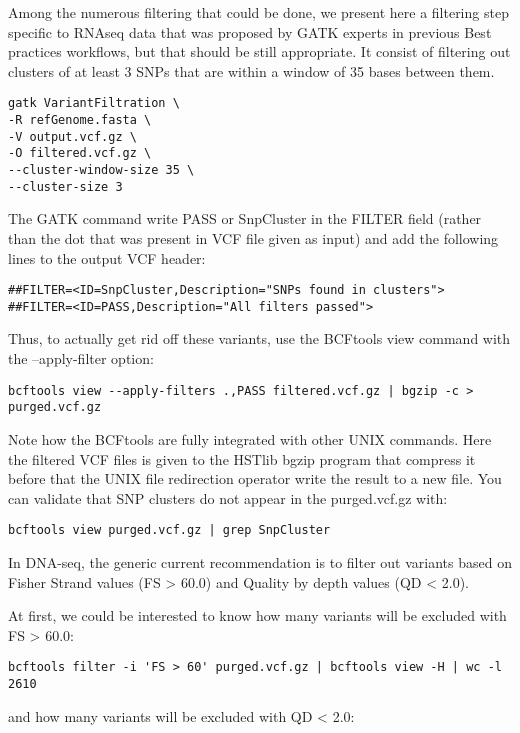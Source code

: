 Among the numerous filtering that could be done, we present here a filtering step specific to RNAseq data that was proposed by GATK experts in previous Best practices workflows, but that should be still appropriate. It consist of filtering out clusters of at least 3 SNPs that are within a window of 35 bases between them.


\begin{verbatim}
gatk VariantFiltration \
-R refGenome.fasta \
-V output.vcf.gz \
-O filtered.vcf.gz \
--cluster-window-size 35 \
--cluster-size 3
\end{verbatim}

The GATK command write PASS or SnpCluster in the FILTER field (rather than the dot that was present in VCF file given as input) and add the following lines to the output VCF header:

\begin{verbatim}
##FILTER=<ID=SnpCluster,Description="SNPs found in clusters">
##FILTER=<ID=PASS,Description="All filters passed">
\end{verbatim}


Thus, to actually get rid off these variants, use the BCFtools view command with the --apply-filter option:
\begin{verbatim}
bcftools view --apply-filters .,PASS filtered.vcf.gz | bgzip -c > purged.vcf.gz
\end{verbatim}


Note how the BCFtools are fully integrated with other UNIX commands. Here the filtered VCF files is given to the HSTlib bgzip program that compress it before that the UNIX file redirection operator write the result to a new file. You can validate that SNP clusters do not appear in the purged.vcf.gz with:


\begin{verbatim}
bcftools view purged.vcf.gz | grep SnpCluster
\end{verbatim}

In DNA-seq, the generic current recommendation is to filter out variants based on Fisher Strand values (FS > 60.0) and Quality by depth values (QD < 2.0).

At first, we could be interested to know how many variants will be excluded with FS > 60.0:

\begin{verbatim}
bcftools filter -i 'FS > 60' purged.vcf.gz | bcftools view -H | wc -l
2610
\end{verbatim}

and how many variants will be excluded with QD < 2.0:


